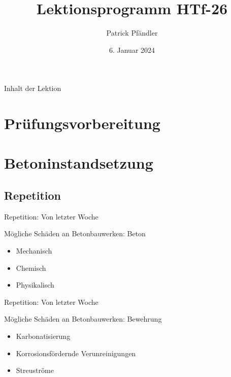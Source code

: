 \def\customoptions{aspectratio=169} %

\title{\textbf{Lektionsprogramm HTf-26}}
\author{Patrick Pfändler}
\date{6. Januar 2024}




\frame{\titlepage}

\begin{frame}{Inhalt der Lektion}
    \tableofcontents
\end{frame}


\section{Prüfungsvorbereitung}
\BlueSectionSlide


\section{Betoninstandsetzung}
\BlueSectionSlide
\subsection{Repetition}
\begin{frame}{Repetition: Von letzter Woche}
    \begin{block}{Mögliche Schäden an Betonbauwerken: Beton}
        \begin{itemize}
            \item[\textbullet] Mechanisch
            \item[\textbullet] Chemisch
            \item[\textbullet] Physikalisch
        \end{itemize}
    \end{block}
\end{frame}


\begin{frame}{Repetition: Von letzter Woche}
    \begin{block}{Mögliche Schäden an Betonbauwerken: Bewehrung}
        \begin{itemize}
            \item[\textbullet] Karbonatisierung
            \item[\textbullet] Korrosionsfördernde Verunreinigungen
            \item[\textbullet] Streuströme
        \end{itemize}
    \end{block}
\end{frame}







